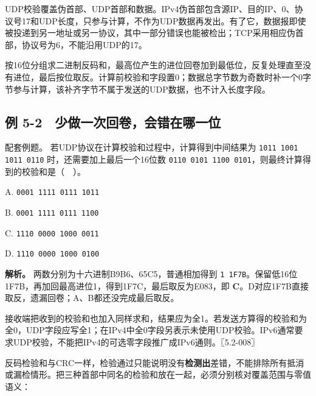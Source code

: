 UDP校验覆盖伪首部、UDP首部和数据。IPv4伪首部包含源IP、目的IP、0、协议号17和UDP长度，只参与计算，不作为UDP数据再发出。有了它，数据报即使被投递到另一地址或另一协议，其中一部分错误也能被检出；TCP采用相应伪首部，协议号为6，不能沿用UDP的17。

按16位分组求二进制反码和，最高位产生的进位回卷加到最低位，反复处理直至没有进位，最后按位取反。计算前校验和字段置0；数据总字节数为奇数时补一个0字节参与计算，该补齐字节不属于发送的UDP数据，也不计入长度字段。

\subsection{例 5-2　少做一次回卷，会错在哪一位}\label{CN05-ex2}

\begin{example}[配套例题]

配套例题。 若UDP协议在计算校验和过程中，计算得到中间结果为 \texttt{1011 1001 1011 0110} 时，还需要加上最后一个16位数 \texttt{0110 0101 1100 0101}，则最终计算得到的校验和是（　）。

A. \texttt{0001 1111 0111 1011}

B. \texttt{0001 1111 0111 1100}

C. \texttt{1110 0000 1000 0011}

D. \texttt{1110 0000 1000 0100}

\end{example}

\textbf{解析。} 两数分别为十六进制B9B6、65C5，普通相加得到 \texttt{1 1F7B}。保留低16位1F7B，再加回最高进位1，得到1F7C，最后取反为E083，即 \textbf{C}。D对应1F7B直接取反，遗漏回卷；A、B都还没完成最后取反。

接收端把收到的校验和也加入同样求和，结果应为全1。若发送方算得的校验和为全0，UDP字段应写全1；在IPv4中全0字段另表示未使用UDP校验。IPv6通常要求UDP校验，不能把IPv4的可选零字段推广成IPv6通则。〖5.2-008〗

反码检验和与CRC一样，检验通过只能说明没有\textbf{检测出}差错，不能排除所有抵消或漏检情形。把三种首部中同名的检验和放在一起，必须分别核对覆盖范围与零值语义：

